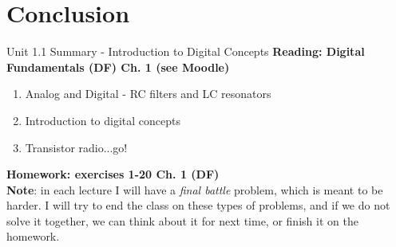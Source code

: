 \documentclass{beamer}
\begin{document}
\section{Conclusion}

\begin{frame}{Unit 1.1 Summary - Introduction to Digital Concepts}
\textbf{Reading: Digital Fundamentals (DF) Ch. 1 (see Moodle)}
\begin{enumerate}
\item Analog and Digital - RC filters and LC resonators
\item Introduction to digital concepts
\item Transistor radio...go!
\end{enumerate}
\textbf{Homework: exercises 1-20 Ch. 1 (DF)} \\
\textbf{Note}: in each lecture I will have a \textit{final battle} problem, which is meant to be harder.  I will try to end the class on these types of problems, and if we do not solve it together, we can think about it for next time, or finish it on the homework.
\end{frame}
\end{document}
